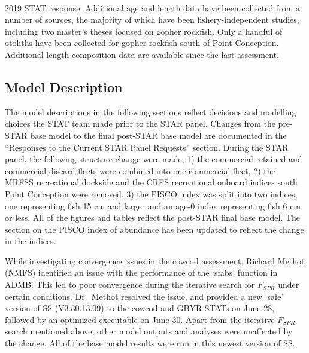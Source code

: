 \documentclass[12pt,]{article}
\begin{document}
\begin{description}[style=unboxed]

  \item[Recommendation 1: Additional length and age composition data should be 
  collected for gopher rockfish. This would help to characterize spatial and possibly 
  temporal variation in growth] \hfill \\

   2019 STAT response: Additional age and length data have been collected from a number of 
   sources, the majority of which have been fishery-independent studies, including 
   two master's theses focused on gopher rockfish.  Only a handful of otoliths have been 
   collected for gopher rockfish south of Point Conception.  Additional length composition 
   data are available since the last assessment.
   
\end{description}

\subsection{Model Description}\label{model-description}

The model descriptions in the following sections reflect decisions and
modelling choices the STAT team made prior to the STAR panel. Changes
from the pre-STAR base model to the final post-STAR base model are
documented in the ``Responses to the Current STAR Panel Requests''
section. During the STAR panel, the following structure change were
made; 1) the commercial retained and commercial discard fleets were
combined into one commercial fleet, 2) the MRFSS recreational dockside
and the CRFS recreational onboard indices south Point Conception were
removed, 3) the PISCO index was split into two indices, one representing
fish 15 cm and larger and an age-0 index representing fish 6 cm or less.
All of the figures and tables reflect the post-STAR final base model.
The section on the PISCO index of abundance has been updated to reflect
the change in the indices.

While investigating convergence issues in the cowcod assessment, Richard
Methot (NMFS) identified an issue with the performance of the `sfabs'
function in ADMB. This led to poor convergence during the iterative
search for \(F_{SPR}\) under certain conditions. Dr.~Methot resolved the
issue, and provided a new `safe' version of SS (V3.30.13.09) to the
cowcod and GBYR STATs on June 28, followed by an optimized executable on
June 30. Apart from the iterative \(F_{SPR}\) search mentioned above,
other model outputs and analyses were unaffected by the change. All of
the base model results were run in this newest version of SS.
\end{document}
